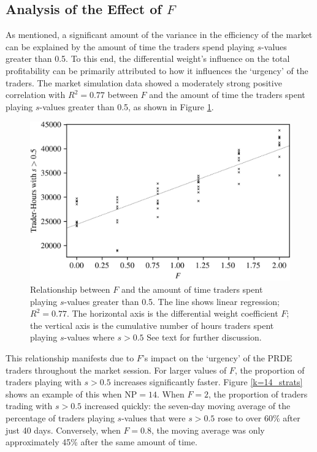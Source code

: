 \documentclass[a4paper,twoside]{article}
\begin{document}
\subsection{Analysis of the Effect of $F$}

As mentioned, a significant amount of the variance in the efficiency of the market can be explained by the amount of time the traders spend playing $s$-values greater than 0.5.
To this end, the differential weight's influence on the total profitability can be primarily attributed to how it influences the `urgency' of the traders.
The market simulation data showed a moderately strong positive correlation with $R^2=0.77$ between $F$ and the amount of time the traders spent playing $s$-values greater than 0.5, as shown in Figure \ref{F_strats}.

\begin{figure}[htbp]
    \centerline{\includegraphics[width=\columnwidth]{F_strats.png}}
    \caption{
        Relationship between $F$ and the amount of time traders spent playing $s$-values greater than 0.5.
        The line shows linear regression; $R^2=0.77$.
        The horizontal axis is the differential weight coefficient $F$; the vertical axis is the cumulative number of hours traders spent playing $s$-values where $s>0.5$
        See text for further discussion.
    }
    \label{F_strats}
\end{figure}

This relationship manifests due to $F$'s impact on the `urgency' of the PRDE traders throughout the market session.
For larger values of $F$, the proportion of traders playing with $s>0.5$ increases significantly faster.
Figure \ref{k=14_strats} shows an example of this when $\mathrm{NP}=14$.
When $F=2$, the proportion of traders trading with $s>0.5$ increased quickly: the seven-day moving average of the percentage of traders playing $s$-values that were $s>0.5$ rose to over 60\% after just 40 days.
Conversely, when $F=0.8$, the moving average was only approximately 45\% after the same amount of time.
\end{document}
